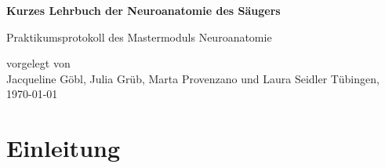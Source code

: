 \documentclass[12pt,a4paper,pdftex]{article}
\begin{document}
\setlength{\parindent}{0pt}


\begin{titlepage}
 \begin{center}
        \vspace*{1cm}
        \LARGE
        \textbf{Kurzes Lehrbuch der Neuroanatomie des Säugers}
        \vspace{2cm}
        
        \Large
        Praktikumsprotokoll des Mastermoduls Neuroanatomie
        \vspace{4cm}
        
        \large
        vorgelegt von \\ Jacqueline Göbl, Julia Grüb, Marta Provenzano und Laura Seidler %
        \vfill
        \large     
        T\"ubingen, \today
    \end{center}
    \newpage
        \thispagestyle{empty}
        \mbox{}
        \newpage
\end{titlepage}


\thispagestyle{empty}
\mbox{}


\tableofcontents
\newpage
\listoffigures



\newpage
\section{Einleitung}
\end{document}
